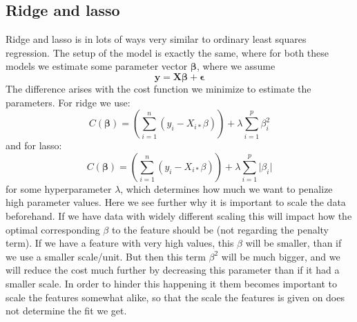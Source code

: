 \documentclass{article}
\begin{document}
\subsection{Ridge and lasso}
Ridge and lasso is in lots of ways very similar to ordinary least squares
regression. The setup of the model is exactly the same, where for both these
models we estimate some parameter vector $\mathbf{\beta}$, where we assume
$$\mathbf{y} = \mathbf{X} \mathbf{\beta} + \mathbf{\epsilon}$$
The difference arises with the cost function we minimize to estimate the parameters. For ridge we use:
$$C(\mathbf{\beta}) = \left(\sum_{i=1}^{n} (y_i - X_{i *} \beta)\right) + \lambda \sum_{i=1}^p \beta_i^2$$
and for lasso:
$$C(\mathbf{\beta}) = \left(\sum_{i=1}^{n} (y_i - X_{i *} \beta)\right) + \lambda \sum_{i=1}^p \lvert \beta_i \rvert$$
for some hyperparameter $\lambda$, which determines how much we want to
penalize high parameter values. Here we see further why it is important to scale
the data beforehand. If we have data with widely different scaling this will
impact how the optimal corresponding $\beta$ to the feature should be (not
regarding the penalty term). If we have a feature with very high values, this
$\beta$ will be smaller, than if we use a smaller scale/unit. But then this term
$\beta^2$ will be much bigger, and we will reduce the cost much further by
decreasing this parameter than if it had a smaller scale. In order to hinder
this happening it them becomes important to scale the features somewhat alike,
so that the scale the features is given on does not determine the fit we get.
\end{document}
